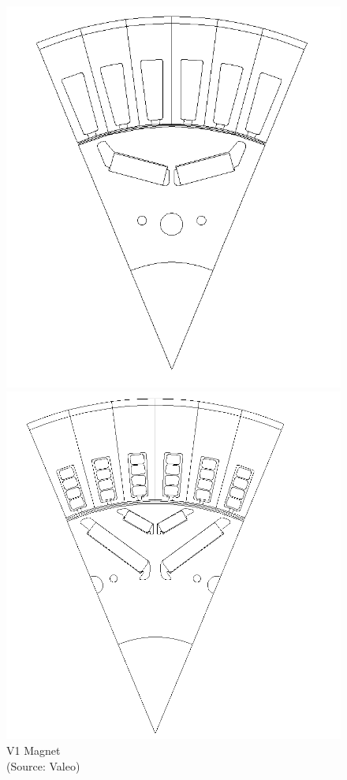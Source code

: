 \documentclass{report} %
\begin{document}
\begin{figure}[H]
    \centering
    \begin{minipage}[b]{0.325\textwidth}
        \centering
        \includegraphics[width=\textwidth]{./ReportImages/1V_Magnet.png}
        \caption{\centering V1 Magnet \\ (Source: Valeo)} %
        \label{fig:V1 Magnet}
    \end{minipage}
    \hfill
    \begin{minipage}[b]{0.325\textwidth}
        \centering
        \includegraphics[width=\textwidth]{./ReportImages/2V_Magnet.png}

\end{minipage}
\end{figure}
\end{document}
